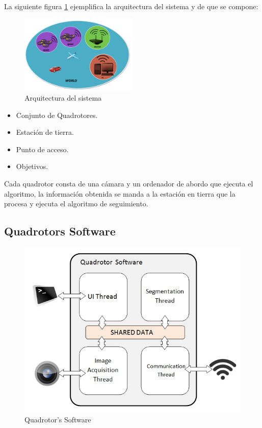 La siguiente figura \ref{fig:System_Architecture} ejemplifica la arquitectura del sistema y de que se compone: \\
\begin{figure}[hp]
	\centering
	\includegraphics[width=0.50\textwidth,natwidth=220,natheight=1467]{../Images/c2/Architecture.png}
	\caption{Arquitectura del sistema}
	\label{fig:System_Architecture}
\end{figure}


\begin{itemize}
  \item Conjunto de Quadrotores.
  \item Estaci\'on de tierra.
  \item Punto de acceso.
  \item Objetivos.
\end{itemize}

Cada quadrotor consta de una c\'amara y un ordenador de abordo que ejecuta el algoritmo, la informaci\'on obtenida se manda a la estaci\'on en tierra que la procesa y ejecuta el algoritmo de seguimiento.

\newpage
\subsection{Quadrotors Software}

	\begin{figure}[hp]
		\begin{center}
			\includegraphics[width=0.7\linewidth]{../Images/c2/Quadsoftware}
		\end{center}
		\caption{Quadrotor's Software}
		\label{fig:Quadsoftware}
	\end{figure}


